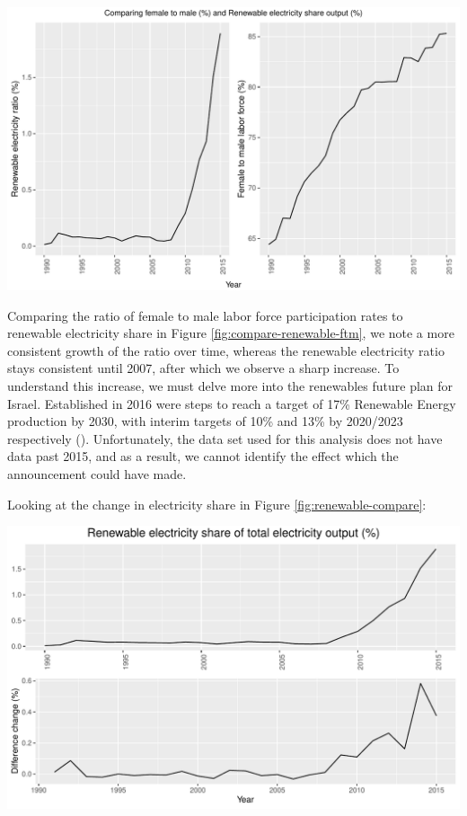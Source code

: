 \documentclass[11pt,a4paper,]{article}
\let\origfigure\figure
\let\endorigfigure\endfigure
\renewenvironment{figure}[1][2] {
    \expandafter\origfigure\expandafter[H]
} {
    \endorigfigure
}%
\begin{document}
\begin{figure}
\centering
\includegraphics{report_files/figure-latex/compare-renewable-ftm-1.pdf}
\caption{\label{fig:compare-renewable-ftm}Comparing female to male ratio to renewable electricity output share}
\end{figure}

Comparing the ratio of female to male labor force participation rates to renewable electricity share in Figure \ref{fig:compare-renewable-ftm}, we note a more consistent growth of the ratio over time, whereas the renewable electricity ratio stays consistent until 2007, after which we observe a sharp increase. To understand this increase, we must delve more into the renewables future plan for Israel. Established in 2016 were steps to reach a target of 17\% Renewable Energy production by 2030, with interim targets of 10\% and 13\% by 2020/2023 respectively (\textcite{IEA2019}). Unfortunately, the data set used for this analysis does not have data past 2015, and as a result, we cannot identify the effect which the announcement could have made.

Looking at the change in electricity share in Figure \ref{fig:renewable-compare}:

\begin{figure}
\centering
\includegraphics{report_files/figure-latex/renewable-compare-1.pdf}
\caption{\label{fig:renewable-compare}Looking at Renewable electricity share, and difference change}
\end{figure}
\end{document}
